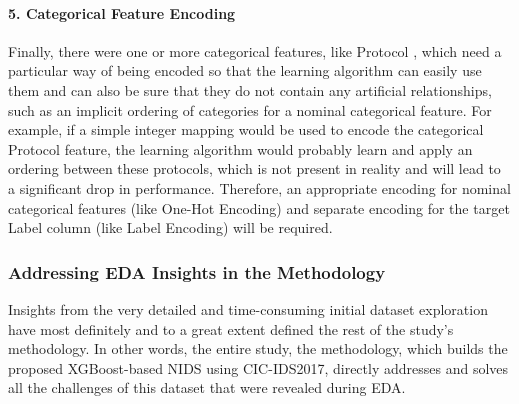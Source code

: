 \paragraph{5. Categorical Feature Encoding} 
Finally, there were one or more categorical features, like Protocol , which need a particular way of being encoded so that the learning algorithm can easily use them and can also be sure that they do not contain any artificial relationships, such as an implicit ordering of categories for a nominal categorical feature. For example, if a simple integer mapping would be used to encode the categorical Protocol feature, the learning algorithm would probably learn and apply an ordering between these protocols, which is not present in reality and will lead to a significant drop in performance. Therefore, an appropriate encoding for nominal categorical features (like One-Hot Encoding) and separate encoding for the target Label column (like Label Encoding) will be required.

\subsubsection{Addressing EDA Insights in the Methodology} 
Insights from the very detailed and time-consuming initial dataset exploration have most definitely and to a great extent defined the rest of the study's methodology. In other words, the entire study, the methodology, which builds the proposed XGBoost-based NIDS using CIC-IDS2017, directly addresses and solves all the challenges of this dataset that were revealed during EDA.

